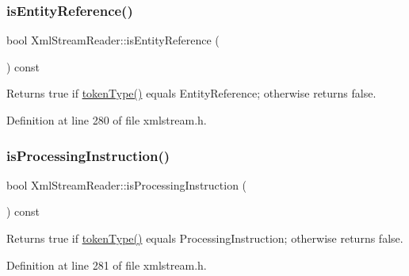 \mbox{\label{class_xml_stream_reader_ac7d9fbea5bf99934c5d862c8ced0d44f}} 
\subsubsection{\texorpdfstring{is\+Entity\+Reference()}{isEntityReference()}}
{\footnotesize\ttfamily bool Xml\+Stream\+Reader\+::is\+Entity\+Reference (\begin{DoxyParamCaption}{ }\end{DoxyParamCaption}) const\hspace{0.3cm}{\ttfamily [inline]}}

Returns {\ttfamily true} if \hyperlink{class_xml_stream_reader_a2c26bfb63c27f2992e24f038d65c8c0a}{token\+Type()} equals  Entity\+Reference; otherwise returns {\ttfamily false}. 

Definition at line 280 of file xmlstream.\+h.

\mbox{\label{class_xml_stream_reader_a66b16a5ab385fbfa167295f41022c37d}} 
\subsubsection{\texorpdfstring{is\+Processing\+Instruction()}{isProcessingInstruction()}}
{\footnotesize\ttfamily bool Xml\+Stream\+Reader\+::is\+Processing\+Instruction (\begin{DoxyParamCaption}{ }\end{DoxyParamCaption}) const\hspace{0.3cm}{\ttfamily [inline]}}

Returns {\ttfamily true} if \hyperlink{class_xml_stream_reader_a2c26bfb63c27f2992e24f038d65c8c0a}{token\+Type()} equals  Processing\+Instruction; otherwise returns {\ttfamily false}. 

Definition at line 281 of file xmlstream.\+h.

\mbox{\label{class_xml_stream_reader_aa5678c8de5e5efd67e85b60dbda6374f}} 
